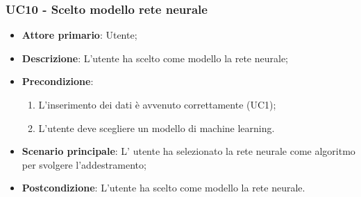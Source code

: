 \subsubsection{UC10 - Scelto modello rete neurale}
\label{sssec:uc10}
\begin{itemize}
  \item \textbf{Attore primario}: Utente;
  \item \textbf{Descrizione}: L'utente ha scelto come modello la rete neurale;
  \item \textbf{Precondizione}:
  \begin{enumerate}
    \item L'inserimento dei dati è avvenuto correttamente (UC1);
    \item L'utente deve scegliere un modello di machine learning.
  \end{enumerate}
  \item \textbf{Scenario principale}: L' utente ha selezionato la rete neurale come algoritmo per svolgere l'addestramento;
  \item \textbf{Postcondizione}: L'utente ha scelto come modello la rete neurale.
\end{itemize}
